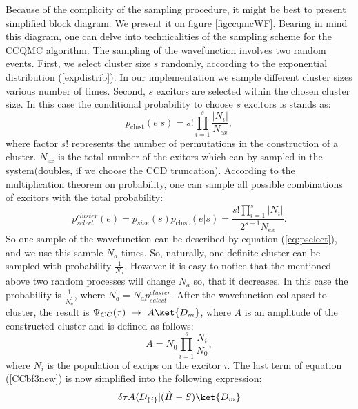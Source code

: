 \documentclass[twoside,english]{uiofysmaster}
\begin{document}
Because of the complicity of the sampling procedure, it might be best to present simplified block diagram. We present it on figure \ref{figccqmcWF}. Bearing in mind this diagram, one can delve into technicalities of the sampling scheme for the CCQMC algorithm.
The sampling of the wavefunction involves two random events.
First, we select cluster size $s$ randomly, according to the exponential distribution (\ref{expdistrib}). In our implementation we sample different cluster sizes various number of times.
Second, $s$ excitors are selected within the chosen cluster size. In this case the conditional probability to choose $s$ excitors is stands as:
\begin{equation}\label{condprob}
p_{\text{clust}} (e|s)= s! \prod_{i=1}^s \frac{|N_i|}{N_{ex}},
\end{equation}
where factor $s!$ represents the number of permutations in the construction of a cluster.
$N_{ex}$ is the total number of the exitors which can by sampled in the system(doubles, if we choose the CCD truncation). According to the multiplication theorem on probability, one can sample all possible combinations of excitors with the total probability:
\begin{equation}\label{eq:pselect}
p_{select}^{cluster}(e)= p_{size}(s) p_{\text{clust}} (e|s) =  \frac{s!\prod_{i=1}^{s} |N_i|}{2^{s+1}N_{ex}}.
\end{equation}
So one sample of the wavefunction can be described by equation (\ref{eq:pselect}), and we use this sample $N_a$ times. So, naturally, one definite cluster can be sampled with probability $\frac{1}{N_a}$. %
However it is easy to notice that the mentioned above two random processes will change $N_a$ so, that it decreases. In this case the probability is $\frac{1}{N_a^\prime}$, where $N_a^\prime = N_a p_{select}^{cluster}$.
After the wavefunction collapsed to cluster, the result is $\Psi_{CC}(\tau)\ \rightarrow\ A\ket{D_m}$,
where $A$ is an amplitude of the constructed cluster and is defined as follows:
\begin{equation}
A = N_0  \prod_{i=1}^s \frac{N_i}{N_0},
\end{equation}
where $N_i$ is the population of excips on the excitor $i$. 
The last term of equation (\ref{CCbf3new}) is now simplified into the following expression:
\begin{equation}\label{simplesampling}
\delta \tau A \langle D_{\{i\}}|(\hat{H}-S)\ket{D_m}
\end{equation}
\end{document}
